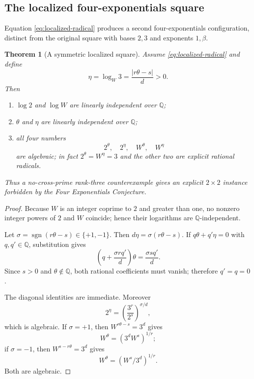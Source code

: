 \documentclass[11pt,oneside]{article}
\theoremstyle{research}
\newtheorem{theorem}{Theorem}[section]
\theoremstyle{definition}
\newcommand{\Q}{\mathbb Q}
\newcommand{\sgn}{\operatorname{sgn}}
\begin{document}
\subsection{The localized four-exponentials square}

Equation \eqref{eq:localized-radical} produces a second four-exponentials
configuration, distinct from the original square with bases $2,3$ and
exponents $1,\beta$.

\begin{theorem}[A symmetric localized square]
\label{thm:localized-square}
Assume \eqref{eq:localized-radical} and define
\begin{equation}
 \eta=\log_W 3
      =\frac{|r\theta-s|}{d}>0.
 \label{eq:eta}
\end{equation}
Then
\begin{enumerate}[label=(\roman*),leftmargin=2em]
\item $\log2$ and $\log W$ are linearly independent over $\Q$;
\item $\theta$ and $\eta$ are linearly independent over $\Q$;
\item all four numbers
\begin{equation}
 2^\theta,
 \quad 2^\eta,
 \quad W^\theta,
 \quad W^\eta
 \label{eq:four-localized}
\end{equation}
are algebraic; in fact $2^\theta=W^\eta=3$ and the other two are explicit
rational radicals.
\end{enumerate}
Thus a no-cross-prime rank-three counterexample gives an explicit
$2\times2$ instance forbidden by the Four Exponentials Conjecture.
\end{theorem}

\begin{proof}
Because $W$ is an integer coprime to $2$ and greater than one, no nonzero
integer powers of $2$ and $W$ coincide; hence their logarithms are
$\Q$-independent.

Let $\sigma=\sgn(r\theta-s)\in\{+1,-1\}$.  Then
$d\eta=\sigma(r\theta-s)$.  If
$q\theta+q'\eta=0$ with $q,q'\in\Q$, substitution gives
\[
 \left(q+\frac{\sigma rq'}d\right)\theta
 =\frac{\sigma sq'}d.
\]
Since $s>0$ and $\theta\notin\Q$, both rational coefficients must vanish;
therefore $q'=q=0$.

The diagonal identities are immediate.  Moreover
\[
 2^\eta
 =\left(\frac{3^r}{2^s}\right)^{\sigma/d},
\]
which is algebraic.  If $\sigma=+1$, then
$W^{r\theta-s}=3^d$ gives
\[
 W^\theta=(3^dW^s)^{1/r};
\]
if $\sigma=-1$, then $W^{s-r\theta}=3^d$ gives
\[
 W^\theta=(W^s/3^d)^{1/r}.
\]
Both are algebraic.
\end{proof}
\end{document}
